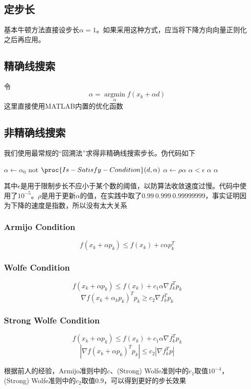 \documentclass[11pt, a4paper]{article}
\begin{document}
\subsection{定步长}
基本牛顿方法直接设步长$\alpha=1$。如果采用这种方式，应当将下降方向向量正则化之后再应用。

\subsection{精确线搜索}
令\[\alpha=\mathop{\arg \min}\limits_\alpha f(x_k+\alpha d)\]
这里直接使用MATLAB内置的优化函数

\subsection{非精确线搜索}

我们使用最常规的“回溯法”求得非精确线搜索步长。伪代码如下
\begin{codebox}
\li $\alpha\gets\alpha_0$
\li \While not $\proc{Is-Satisfy-Condition}(d,\alpha)$
	\Do
\li		$\alpha\gets\rho\alpha$
\li		\If $\alpha<\epsilon$
\li			\Then  \Return $\alpha$		
		\End
	\End
\li \Return $\alpha$
\end{codebox}

其中$\epsilon$是用于限制步长不应小于某个数的阈值，以防算法收敛速度过慢。代码中使用了$10^{-5}$。$\rho$是用于更新$\alpha$的值，在实践中取了$0.99~0.999~0.99999999$，事实证明因为下降的速度是指数，所以没有太大关系


\subsubsection{Armijo Condition}
\[f(x_k+\alpha p_k)\le f(x_k)+c\alpha p_k^T\]

\subsubsection{Wolfe Condition}
\[f(x_k+\alpha p_k)\le f(x_k)+c_1\alpha\nabla f_k^Tp_k\]
\[\nabla f(x_k+\alpha_kp_k)^Tp_k \ge c_2\nabla f_k^Tp_k\]

\subsubsection{Strong Wolfe Condition}
\[f(x_k+\alpha p_k)\le f(x_k)+c_1\alpha\nabla f_k^Tp_k\]
\[|\nabla f(x_k+\alpha p_k)^Tp_k| \le c_2|\nabla f_k^Tp|\]

根据前人的经验\cite{gilbert1989some}，Armijo准则中的$c$、(Strong) Wolfe准则中的$c_1$取值$10^{-4}$，(Strong) Wolfe准则中的$c_2$取值$0.9$，可以得到更好的步长效果
\end{document}
